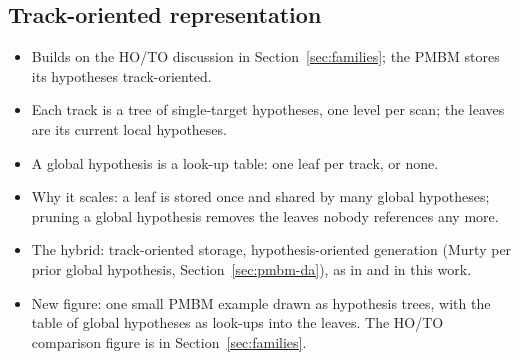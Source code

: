 \subsection{Track-oriented representation}
\label{sec:pmbm-representation}
\label{sec:anatomy-hyp}
\begin{itemize}
    \item Builds on the HO/TO discussion in Section~\ref{sec:families}; the PMBM stores its hypotheses track-oriented.
    \item Each track is a tree of single-target hypotheses, one level per scan; the leaves are its current local hypotheses.
    \item A global hypothesis is a look-up table: one leaf per track, or none.
    \item Why it scales: a leaf is stored once and shared by many global hypotheses; pruning a global hypothesis removes the leaves nobody references any more.
    \item The hybrid: track-oriented storage, hypothesis-oriented generation (Murty per prior global hypothesis, Section~\ref{sec:pmbm-da}), as in \cite{garcia_2018_pmbm} and in this work.
    \item New figure: one small PMBM example drawn as hypothesis trees, with the table of global hypotheses as look-ups into the leaves. The HO/TO comparison figure is in Section~\ref{sec:families}.
\end{itemize}

